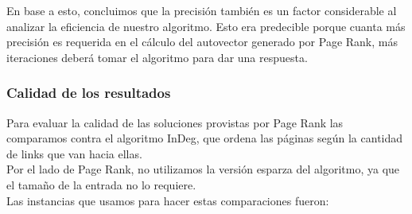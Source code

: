 En base a esto, concluimos que la precisión también es un factor considerable al analizar la eficiencia de nuestro algoritmo. Esto era predecible porque cuanta más precisión es requerida en el cálculo del autovector generado por Page Rank, más iteraciones deberá tomar el algoritmo para dar una respuesta.

\subsubsection{Calidad de los resultados}

Para evaluar la calidad de las soluciones provistas por Page Rank las comparamos contra el algoritmo InDeg, que ordena las páginas según la cantidad de links que van hacia ellas.\\
Por el lado de Page Rank, no utilizamos la versión esparza del algoritmo, ya que el tamaño de la entrada no lo requiere.\\
Las instancias que usamos para hacer estas comparaciones fueron:


